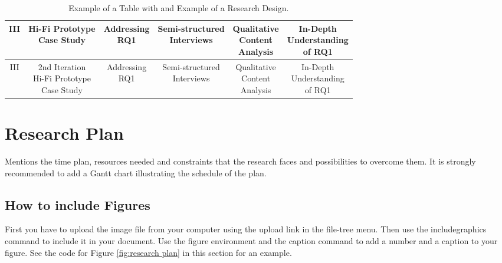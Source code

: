 \documentclass{article}
\begin{document}
\begin{table}[htb]
\begin{tabular}{|c|c|c|c|c|c|}
III & \makecell{Hi-Fi Prototype \\ Case Study} & \makecell{Addressing\\RQ1}
& \makecell{Semi-structured\\Interviews} & \makecell{Qualitative \\Content \\ Analysis} 
& \makecell{In-Depth \\ Understanding\\ of RQ1} \\\hline 

III & \makecell{2nd Iteration \\ Hi-Fi Prototype \\ Case Study} & \makecell{Addressing\\RQ1}
& \makecell{Semi-structured\\Interviews} & \makecell{Qualitative \\Content \\ Analysis} 
& \makecell{In-Depth \\ Understanding\\ of RQ1} \\\hline 

\end{tabular}
\caption{\label{tab:research design}Example of a Table with and Example of a Research Design.}
\end{table}



\section{Research Plan}
Mentions the time plan, resources needed and constraints that the research faces and possibilities to overcome them.
It is strongly recommended to add a Gantt chart illustrating the schedule of the plan.


\subsection{How to include Figures}

First you have to upload the image file from your computer using the upload link in the file-tree menu. Then use the includegraphics command to include it in your document. Use the figure environment and the caption command to add a number and a caption to your figure. See the code for Figure \ref{fig:research plan} in this section for an example.
\end{document}
